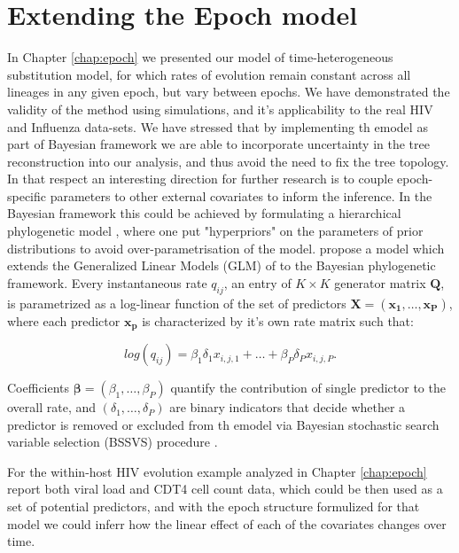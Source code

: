 \section{Extending the Epoch model}
In Chapter \ref{chap:epoch} we presented our model of time-heterogeneous substitution model, for which rates of evolution remain constant across all lineages in any given epoch, but vary between epochs.
We have demonstrated the validity of the method using simulations, and it's applicability to the real HIV and Influenza data-sets.
We have stressed that by implementing th emodel as part of Bayesian framework we are able to incorporate uncertainty in the tree reconstruction into our analysis, and thus avoid the need to fix the tree topology.
In that respect an interesting direction for further research is to couple epoch-specific parameters to other external covariates to inform the inference.
In the Bayesian framework this could be achieved by formulating a hierarchical phylogenetic model \citep{Edo-Matas2011}, where one put "hyperpriors" on the parameters of prior distributions to avoid over-parametrisation of the model.
\citet{Lemey2014} propose a model which extends the Generalized Linear Models (GLM) of \citet{Nelder1972} to the Bayesian phylogenetic framework.
Every instantaneous rate $q_{ij}$, an entry of $K \times K$ generator matrix $\mathbf{Q}$, is parametrized as a log-linear function of the set of predictors $\mathbf{X}=\left( \mathbf{x_{1}},\ldots,\mathbf{x_{P}}\right)$, where each predictor $\mathbf{x_{p}}$ is characterized by it's own rate matrix such that:

\begin{equation}
log(q_{ij})=\beta_{1}\delta_{1}x_{i,j,1}+\ldots+\beta_{P}\delta_{P}x_{i,j,P}.
\label{eq:glm}
\end{equation}

Coefficients $\mathbf{\beta}=\left(\beta_{1},\ldots,\beta_{P}\right)$ quantify the contribution of single predictor to the overall rate, and $\left(\delta_{1},\ldots,\delta_{P}\right)$ are binary indicators that decide whether a predictor is removed or excluded from th emodel via Bayesian stochastic search variable selection (BSSVS) procedure \citep{Kuo1998,Lemey2009}.

For the within-host HIV evolution example analyzed in Chapter \ref{chap:epoch} \citet{Shankarappa99} report both viral load and CDT4 cell count data, which could be then used as a set of potential predictors, and with the epoch structure formulized for that model we could inferr how the linear effect of each of the covariates changes over time.

